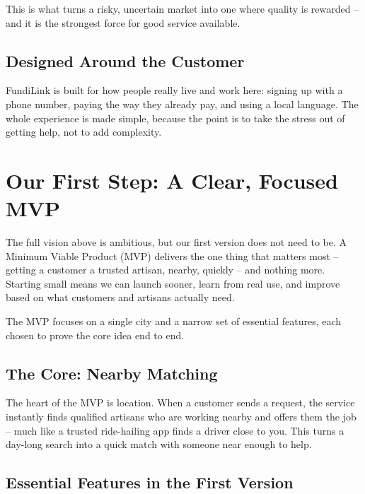 \documentclass[11pt,a4paper]{article}
\begin{document}
This is what turns a risky, uncertain market into one where quality is rewarded -- and it is
the strongest force for good service available.

\subsection{Designed Around the Customer}

FundiLink is built for how people really live and work here: signing up with a phone number,
paying the way they already pay, and using a local language. The whole experience is made
simple, because the point is to take the stress out of getting help, not to add complexity.

\section{Our First Step: A Clear, Focused MVP}

The full vision above is ambitious, but our first version does not need to be. A Minimum
Viable Product (MVP) delivers the one thing that matters most -- getting a customer a trusted
artisan, nearby, quickly -- and nothing more. Starting small means we can launch sooner, learn
from real use, and improve based on what customers and artisans actually need.

The MVP focuses on a single city and a narrow set of essential features, each chosen to prove
the core idea end to end.

\subsection{The Core: Nearby Matching}

The heart of the MVP is location. When a customer sends a request, the service instantly
finds qualified artisans who are working nearby and offers them the job -- much like a trusted
ride-hailing app finds a driver close to you. This turns a day-long search into a quick match
with someone near enough to help.

\subsection{Essential Features in the First Version}
\end{document}
